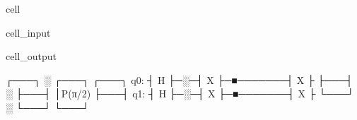 \documentclass[letterpaper,10pt,english]{jupyterBook}
\begin{document}
\begin{sphinxuseclass}{cell}\begin{sphinxVerbatimInput}

\begin{sphinxuseclass}{cell_input}
\begin{sphinxVerbatim}[commandchars=\\\{\}]
\PYG{p}{[}\PYG{p}{]}
\PYG{p}{[}\PYG{p}{]}
\end{sphinxVerbatim}

\end{sphinxuseclass}\end{sphinxVerbatimInput}
\begin{sphinxVerbatimOutput}

\begin{sphinxuseclass}{cell_output}
\begin{sphinxVerbatim}[commandchars=\\\{\}]
     ┌───┐ ░ ┌───┐         ┌───┐
q\PYGZus{}0: ┤ H ├─░─┤ X ├─■───────┤ X ├
     ├───┤ ░ ├───┤ │P(π/2) ├───┤
q\PYGZus{}1: ┤ H ├─░─┤ X ├─■───────┤ X ├
     └───┘ ░ └───┘         └───┘
\end{sphinxVerbatim}

\end{sphinxuseclass}\end{sphinxVerbatimOutput}

\end{sphinxuseclass}
\end{document}
